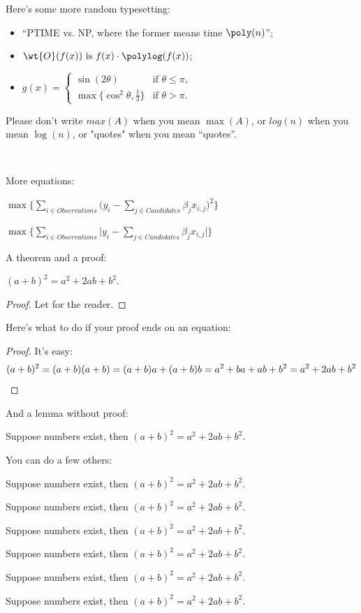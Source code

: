 \documentclass[12pt]{article}
\begin{document}
Here's some more random typesetting: 
\begin{itemize}
\item ``PTIME vs. NP, where the former means time $\poly(n)$'';
\item $\wt{O}(f(x)) \text{ is } f(x) \cdot \polylog(f(x))$;
\item $\displaystyle 
        g(x) = \begin{cases}
                   \sin(2\theta) & \text{if $\theta \leq \pi$,}\\
                   \max\{\cos^2\theta, \tfrac13\} & \text{if $\theta > \pi$.}
               \end{cases}
      $
\end{itemize}
Please don't write $max(A)$ when you mean $\max(A)$, or $log(n)$ when you mean $\log(n)$, or "quotes" when you mean ``quotes''.

\

More equations:

$\max \Big\{ \sum_{i \in Observations} \Big( y_i - \sum_{j \in Candidates} \beta_j x_{i,j} \Big) ^2 \Big\}$

$\max\Bigg\{ \sum_{i \in Observations} \Big| y_i - \sum_{j \in Candidates} \beta_j x_{i,j} \Big| \Bigg\}$

A theorem and a proof:
\begin{theorem} $(a+b)^2 = a^2 + 2ab + b^2$.
\end{theorem}
\begin{proof}
Let for the reader.
\end{proof}

\bigskip

Here's what to do if your proof ends on an equation:
\begin{proof}
It's easy:
\[
    (a+b)^2 = (a+b)(a+b) = (a+b)a + (a+b)b = a^2 + ba + ab + b^2 = a^2 + 2ab + b^2 \qedhere
\]
\end{proof}

And a lemma without proof:
\begin{lemma}
Suppose numbers exist, then $(a+b)^2 = a^2 + 2ab + b^2$.
\end{lemma}

You can do a few others:
\begin{example}
Suppose numbers exist, then $(a+b)^2 = a^2 + 2ab + b^2$.
\end{example}
\begin{conjecture}
Suppose numbers exist, then $(a+b)^2 = a^2 + 2ab + b^2$.
\end{conjecture}
\begin{definition}
Suppose numbers exist, then $(a+b)^2 = a^2 + 2ab + b^2$.
\end{definition}
\begin{observation}
Suppose numbers exist, then $(a+b)^2 = a^2 + 2ab + b^2$.
\end{observation}
\begin{remark}
Suppose numbers exist, then $(a+b)^2 = a^2 + 2ab + b^2$.
\end{remark}
\begin{claim}
Suppose numbers exist, then $(a+b)^2 = a^2 + 2ab + b^2$.
\end{claim}
\end{document}
